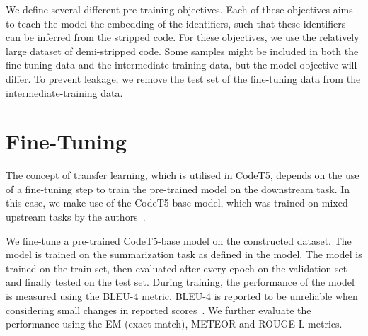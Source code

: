 We define several different pre-training objectives. Each of these objectives aims to teach the model the embedding of the identifiers, such that these identifiers can be inferred from the stripped code. For these objectives, we use the relatively large dataset of demi-stripped code. Some samples might be included in both the fine-tuning data and the intermediate-training data, but the model objective will differ. To prevent leakage, we remove the test set of the fine-tuning data from the intermediate-training data. 

\section{Fine-Tuning}
The concept of transfer learning, which is utilised in CodeT5, depends on the use of a fine-tuning step to train the pre-trained model on the downstream task. In this case, we make use of the CodeT5-base model, which was trained on mixed upstream tasks by the authors~\cite{CodeT5}.

We fine-tune a pre-trained CodeT5-base model on the constructed dataset. The model is trained on the summarization task as defined in the model. The model is trained on the train set, then evaluated after every epoch on the validation set and finally tested on the test set. During training, the performance of the model is measured using the BLEU-4 metric. BLEU-4 is reported to be unreliable when considering small changes in reported scores~\cite{CodeSumMetrics}. We further evaluate the performance using the EM (exact match), METEOR and ROUGE-L metrics.

